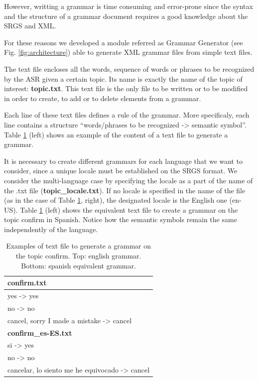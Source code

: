\documentclass[11pt,a4paper]{article}
\begin{document}
However, writting a grammar is time consuming and error-prone since the syntax and the structure of a grammar document requires a good knowledge about the SRGS and XML.

For these reasons we developed a module referred as Grammar Generator (see Fig. \ref{fig:architecture}) able to generate XML grammar files from simple text files.

The text file encloses all the words, sequence of words or phrases to be recognized
by the ASR given a certain topic. Its name is exactly the name of the topic of interest: \textbf{topic.txt}.
This text file is the only file to be written or to be modified in order to create, to
add or to delete elements from a grammar.

Each line of these text files defines a rule of the grammar. More specificaly, each line contains a structure ``{\ttfamily words/phrases to be recognized -> semantic symbol}''.
Table \ref{tab:grammarFileExample} (left) shows an example of the content of a text file to generate a grammar.

It is necessary to create different grammars for each language that we want to consider, since a unique locale must be established on the SRGS format. 
We consider the multi-language case by specifying the locale as a part of the name of the .txt file (\textbf{topic\_locale.txt}). If no locale is specified in the name of the file (as in the case of Table \ref{tab:grammarFileExample}, right), the designated locale is the English one (en-US).  
Table \ref{tab:grammarFileExample} (left) shows the equivalent text file to create a grammar on the topic confirm in Spanish. Notice how the semantic symbols remain the same independently of the language.

\begin{table}[h]
{\ttfamily
\begin{center}
  \begin{tabular}{|l|}
    \hline
\bf{confirm.txt} \\
    \hline
yes -> yes\\
no  -> no \\
cancel, sorry I made a mistake -> cancel \\
    \hline
\bf{confirm\_es-ES.txt}\\
    \hline
si -> yes\\
no -> no\\
cancelar, lo siento me he equivocado -> cancel \\
    \hline
  \end{tabular}
\end{center}
}
    \caption{Examples of text file to generate a grammar on the topic confirm. Top: english grammar. Bottom: spanish equivalent grammar.}
    \label{tab:grammarFileExample}   
\end{table}
\end{document}
